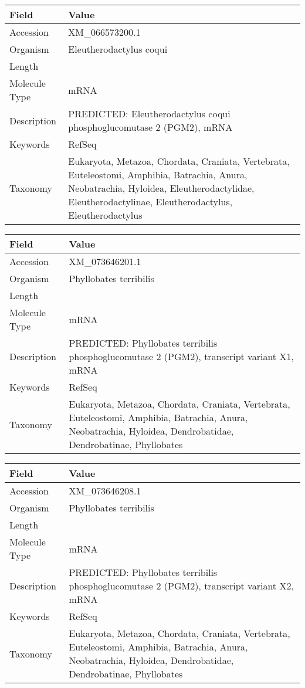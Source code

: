 \documentclass[10pt]{article}
\begin{document}
{\footnotesize
\begin{longtable}{>{\raggedright\arraybackslash}p{4.5cm} >{\raggedright\arraybackslash}p{11.5cm}}
\textbf{Field} & \textbf{Value} \\
\hline
Accession & XM\_066573200.1 \\
Organism & Eleutherodactylus coqui \\
Length & 2255 \\
Molecule Type & mRNA \\
Description & PREDICTED: Eleutherodactylus coqui phosphoglucomutase 2 (PGM2), mRNA \\
Keywords & RefSeq \\
Taxonomy & Eukaryota, Metazoa, Chordata, Craniata, Vertebrata, Euteleostomi, Amphibia, Batrachia, Anura, Neobatrachia, Hyloidea, Eleutherodactylidae, Eleutherodactylinae, Eleutherodactylus, Eleutherodactylus \\
\end{longtable}
}

{\footnotesize
\begin{longtable}{>{\raggedright\arraybackslash}p{4.5cm} >{\raggedright\arraybackslash}p{11.5cm}}
\textbf{Field} & \textbf{Value} \\
\hline
Accession & XM\_073646201.1 \\
Organism & Phyllobates terribilis \\
Length & 2266 \\
Molecule Type & mRNA \\
Description & PREDICTED: Phyllobates terribilis phosphoglucomutase 2 (PGM2), transcript variant X1, mRNA \\
Keywords & RefSeq \\
Taxonomy & Eukaryota, Metazoa, Chordata, Craniata, Vertebrata, Euteleostomi, Amphibia, Batrachia, Anura, Neobatrachia, Hyloidea, Dendrobatidae, Dendrobatinae, Phyllobates \\
\end{longtable}
}

{\footnotesize
\begin{longtable}{>{\raggedright\arraybackslash}p{4.5cm} >{\raggedright\arraybackslash}p{11.5cm}}
\textbf{Field} & \textbf{Value} \\
\hline
Accession & XM\_073646208.1 \\
Organism & Phyllobates terribilis \\
Length & 2182 \\
Molecule Type & mRNA \\
Description & PREDICTED: Phyllobates terribilis phosphoglucomutase 2 (PGM2), transcript variant X2, mRNA \\
Keywords & RefSeq \\
Taxonomy & Eukaryota, Metazoa, Chordata, Craniata, Vertebrata, Euteleostomi, Amphibia, Batrachia, Anura, Neobatrachia, Hyloidea, Dendrobatidae, Dendrobatinae, Phyllobates \\
\end{longtable}
}
\end{document}
